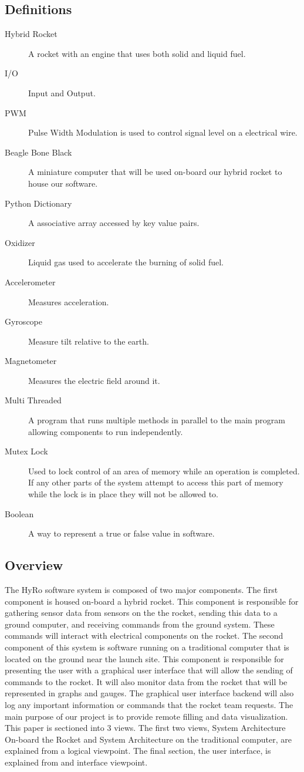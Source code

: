 \documentclass[10pt,draftclsnofoot,onecolumn,compsoc]{IEEEtran}
\begin{document}
\subsection{Definitions}
\begin{description}
	\item[Hybrid Rocket] A rocket with an engine that uses both solid and liquid fuel.
	\item[I/O] Input and Output.
	\item[PWM] Pulse Width Modulation is used to control signal level on a electrical wire.
	\item[Beagle Bone Black] A miniature computer that will be used on-board our hybrid rocket to house our software.
	\item[Python Dictionary] A associative array accessed by key value pairs.
	\item[Oxidizer] Liquid gas used to accelerate the burning of solid fuel.
	\item[Accelerometer] Measures acceleration.
	\item[Gyroscope] Measure tilt relative to the earth.
	\item[Magnetometer] Measures the electric field around it.
	\item[Multi Threaded] A program that runs multiple methods in parallel to the main program allowing components to run independently.
	\item[Mutex Lock] Used to lock control of an area of memory while an operation is completed. If any other parts of the system attempt to access this part of memory while the lock is in place they will not be allowed to.
	\item[Boolean] A way to represent a true or false value in software.
\end{description}
\subsection{Overview}
The HyRo software system is composed of two major components. The first component is housed on-board a hybrid rocket. This component is responsible for gathering sensor data from sensors on the the rocket, sending this data to a ground computer, and receiving commands from the ground system. These commands will interact with electrical components on the rocket. The second component of this system is software running on a traditional computer that is located on the ground near the launch site. This component is responsible for presenting the user with a graphical user interface that will allow the sending of commands to the rocket. It will also monitor data from the rocket that will be represented in graphs and gauges. The graphical user interface backend will also log any important information or commands that the rocket team requests. The main purpose of our project is to provide remote filling and data visualization. This paper is sectioned into 3 views. The first two views, System Architecture On-board the Rocket and System Architecture on the traditional computer, are explained from a logical viewpoint. The final section, the user interface, is explained from and interface viewpoint.
\end{document}
